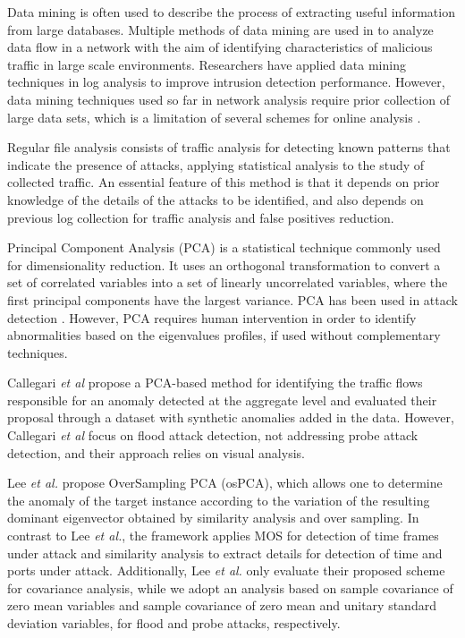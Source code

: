 \documentclass[review]{elsarticle}
\begin{document}
Data mining is often used to describe the process of extracting useful information from large databases. Multiple methods of data mining are used in \cite{he2008applying,osanaiye2016distributed} to analyze data flow in a network with the aim of identifying characteristics of malicious traffic in large scale environments. Researchers have applied data mining techniques in log analysis \cite{ghourabi2010data} to improve intrusion detection performance. However, data mining techniques used so far in network analysis require prior collection of large data sets, which is a limitation of several schemes for online analysis \cite{Huang2009}.

Regular file analysis \cite{raynal2004honeypot} consists of traffic analysis for detecting known patterns that indicate the presence of attacks, applying statistical analysis to the study of collected traffic. An essential feature of this method is that it depends on prior knowledge of the details of the attacks to be identified, and also depends on previous log collection for traffic analysis and false positives reduction.

Principal Component Analysis (PCA) is a statistical technique commonly used for dimensionality reduction. It uses an orthogonal transformation to convert a set of correlated variables into a set of linearly uncorrelated variables, where the first principal components have the largest variance. PCA has been used in attack detection \cite{almotairi2009technique}. However, PCA requires human intervention in order to identify abnormalities based on the eigenvalues profiles, if used without complementary techniques.

Callegari \emph{et al} \cite{Zonglin2009} propose a PCA-based method for identifying the traffic flows responsible for an anomaly detected at the aggregate level and evaluated their proposal through a dataset with synthetic anomalies added in the data. However, Callegari \emph{et al} focus on flood attack detection, not addressing probe attack detection, and their approach relies on visual analysis. 

Lee \emph{et al.} \cite{Lee2013} propose OverSampling PCA (osPCA), which allows one to determine the anomaly of the target instance according to the variation of the resulting dominant eigenvector obtained by similarity analysis and over sampling. In contrast to Lee \emph{et al.}, the framework applies MOS for detection of time frames under attack and similarity analysis to extract details for detection of time and ports under attack. Additionally, Lee \emph{et al.} only evaluate their proposed scheme for covariance analysis, while we adopt an analysis based on sample covariance of zero mean variables and sample covariance of zero mean and unitary standard deviation variables, for flood and probe attacks, respectively. 
\end{document}

